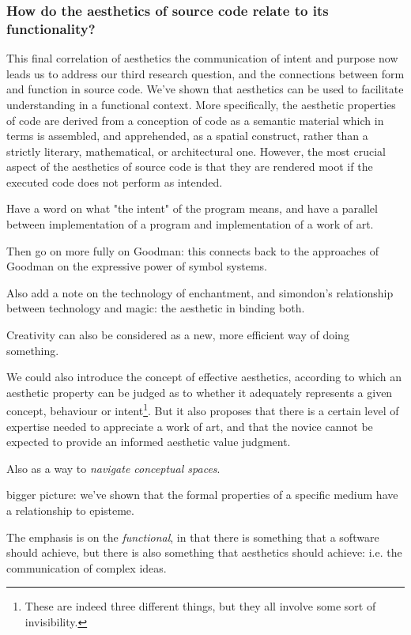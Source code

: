 \subsubsection{How do the aesthetics of source code relate to its functionality?} %

This final correlation of aesthetics the communication of intent and purpose now leads us to address our third research question, and the connections between form and function in source code. We've shown that aesthetics can be used to facilitate understanding in a functional context. More specifically, the aesthetic properties of code are derived from a conception of code as a semantic material which in terms is assembled, and apprehended, as a spatial construct, rather than a strictly literary, mathematical, or architectural one. However, the most crucial aspect of the aesthetics of source code is that they are rendered moot if the executed code does not perform as intended.

Have a word on what "the intent" of the program means, and have a parallel between implementation of a program and implementation of a work of art.

Then go on more fully on Goodman: this connects back to the approaches of Goodman on the expressive power of symbol systems.

Also add a note on the technology of enchantment, and simondon's relationship between technology and magic: the aesthetic in binding both.

Creativity can also be considered as a new, more efficient way of doing something.

We could also introduce the concept of effective aesthetics, according to which an aesthetic property can be judged as to whether it adequately represents a given concept, behaviour or intent\footnote{These are indeed three different things, but they all involve some sort of invisibility.}. But it also proposes that there is a certain level of expertise needed to appreciate a work of art, and that the novice cannot be expected to provide an informed aesthetic value judgment.

Also as a way to \emph{navigate conceptual spaces}.

bigger picture: we've shown that the formal properties of a specific medium have a relationship to episteme.

The emphasis is on the \emph{functional}, in that there is something that a software should achieve, but there is also something that aesthetics should achieve: i.e. the communication of complex ideas.

